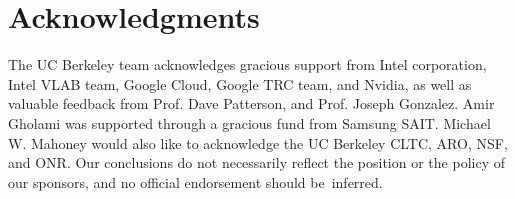 \documentclass{article}
\begin{document}
\printAffiliationsAndNotice{\icmlEqualContribution} %





%



\section*{Acknowledgments}
The UC Berkeley team acknowledges gracious support from Intel corporation, Intel VLAB team, Google Cloud, Google TRC team, and Nvidia, as well as valuable feedback from Prof. Dave Patterson, and Prof. Joseph Gonzalez.
Amir Gholami was supported through a gracious fund from Samsung SAIT.
Michael W. Mahoney would also like to acknowledge the UC Berkeley CLTC, ARO, NSF, and ONR.
Our conclusions do not necessarily reflect the position or the policy of our sponsors, and no official endorsement should be~inferred.




\clearpage

\end{document}
